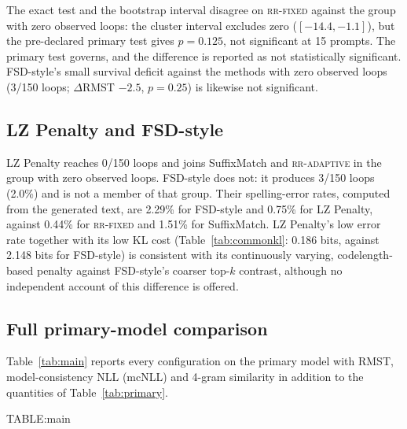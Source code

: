 The exact test and the bootstrap interval disagree on \textsc{rr-fixed} against the group with zero observed loops: the cluster interval excludes zero ($[-14.4,-1.1]$), but the pre-declared primary test gives $p{=}0.125$, not significant at 15 prompts. The primary test governs, and the difference is reported as not statistically significant. FSD-style's small survival deficit against the methods with zero observed loops (3/150 loops; $\Delta$RMST $-2.5$, $p{=}0.25$) is likewise not significant.

\subsection{LZ Penalty and FSD-style}
\label{ssec:results-fsd-lz}
LZ Penalty reaches 0/150 loops and joins SuffixMatch and \textsc{rr-adaptive} in the group with zero observed loops. FSD-style does not: it produces 3/150 loops (2.0\%) and is not a member of that group. Their spelling-error rates, computed from the generated text, are 2.29\% for FSD-style and 0.75\% for LZ Penalty, against 0.44\% for \textsc{rr-fixed} and 1.51\% for SuffixMatch. LZ Penalty's low error rate together with its low KL cost (Table~\ref{tab:commonkl}: 0.186 bits, against 2.148 bits for FSD-style) is consistent with its continuously varying, codelength-based penalty against FSD-style's coarser top-$k$ contrast, although no independent account of this difference is offered.



\subsection{Full primary-model comparison}\label{ssec:fullmain}
Table~\ref{tab:main} reports every configuration on the primary model with RMST, model-consistency NLL (mcNLL) and 4-gram similarity in addition to the quantities of Table~\ref{tab:primary}.

{{TABLE:main}}
